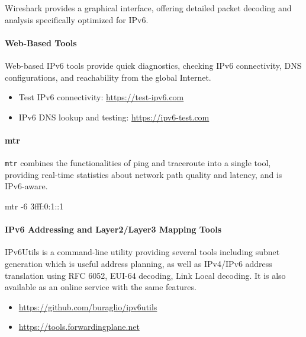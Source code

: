 \documentclass[
]{article}
\newenvironment{Shaded}{}{}
\newcommand{\AttributeTok}[1]{\textcolor[rgb]{0.49,0.56,0.16}{#1}}
\newcommand{\ExtensionTok}[1]{#1}
\newcommand{\NormalTok}[1]{#1}
\providecommand{\tightlist}{%
  \setlength{\itemsep}{0pt}\setlength{\parskip}{0pt}}
\begin{document}
Wireshark provides a graphical interface, offering detailed packet
decoding and analysis specifically optimized for IPv6.

\paragraph{Web-Based Tools}\label{web-based-tools}

Web-based IPv6 tools provide quick diagnostics, checking IPv6
connectivity, DNS configurations, and reachability from the global
Internet.

\begin{itemize}
\tightlist
\item
  Test IPv6 connectivity:
  \href{https://test-ipv6.com}{\url{https://test-ipv6.com}}
\item
  IPv6 DNS lookup and testing:
  \href{https://ipv6-test.com}{\url{https://ipv6-test.com}}
\end{itemize}

\paragraph{mtr}\label{mtr}

\texttt{mtr} combines the functionalities of ping and traceroute into a
single tool, providing real-time statistics about network path quality
and latency, and is IPv6-aware.

\begin{Shaded}
\begin{Highlighting}[]
\ExtensionTok{mtr} \AttributeTok{{-}6}\NormalTok{ 3fff:0:1::1}
\end{Highlighting}
\end{Shaded}

\paragraph{IPv6 Addressing and Layer2/Layer3 Mapping
Tools}\label{ipv6-addressing-and-layer2layer3-mapping-tools}

IPv6Utils is a command-line utility providing several tools including
subnet generation which is useful address planning, as well as IPv4/IPv6
address translation using RFC 6052, EUI-64 decoding, Link Local
decoding. It is also available as an online service with the same
features.

\begin{itemize}
\item
  \href{https://github.com/buraglio/ipv6utils}{\url{https://github.com/buraglio/ipv6utils}}
\item
  \href{https://tools.forwardingplane.net}{\url{https://tools.forwardingplane.net}}
\end{itemize}
\end{document}
